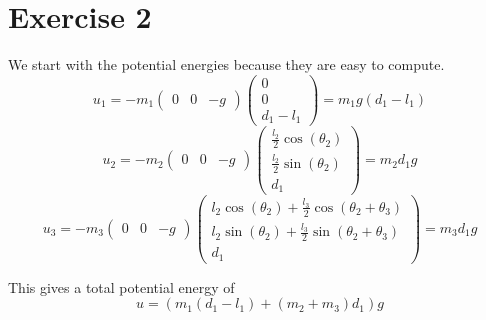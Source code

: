 \documentclass[10pt,a4paper]{article}
\begin{document}
\section*{Exercise 2}

We start with the potential energies because they are easy to compute.
\begin{equation*}
  u_{1} = -m_{1} \begin{pmatrix}
    0 & 0 & -g
  \end{pmatrix} \begin{pmatrix}
    0\\0\\d_{1} - l_{1}
  \end{pmatrix} = m_{1}g(d_{1} - l_{1})
\end{equation*}
\begin{equation*}
  u_{2} = -m_{2} \begin{pmatrix}
    0 & 0 & -g
  \end{pmatrix} \begin{pmatrix}
    \frac{l_{2}}{2}\cos(\theta_{2})\\
    \frac{l_{2}}{2}\sin(\theta_{2})\\
    d_{1}
  \end{pmatrix} = m_{2} d_{1} g
\end{equation*}
\begin{equation*}
  u_{3} = -m_{3} \begin{pmatrix}
    0 & 0 & -g
  \end{pmatrix} \begin{pmatrix}
    l_{2}\cos(\theta_{2}) + \frac{l_{3}}{2}\cos(\theta_{2} + \theta_{3})\\
    l_{2}\sin(\theta_{2}) + \frac{l_{3}}{2}\sin(\theta_{2} + \theta_{3})\\
    d_{1}
  \end{pmatrix} = m_{3} d_{1} g
\end{equation*}

This gives a total potential energy of
\begin{equation*}
  u = \left( m_{1}(d_{1} - l_{1}) + (m_{2} + m_{3})d_{1} \right) g
\end{equation*}
\end{document}
